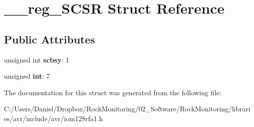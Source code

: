 \hypertarget{struct____reg___s_c_s_r}{}\section{\+\_\+\+\_\+reg\+\_\+\+S\+C\+SR Struct Reference}
\label{struct____reg___s_c_s_r}
\subsection*{Public Attributes}
\begin{DoxyCompactItemize}
\item 
unsigned int {\bfseries scbsy}\+: 1\hypertarget{struct____reg___s_c_s_r_a1780dfd1d47a42196b43c7d993576e01}{}\label{struct____reg___s_c_s_r_a1780dfd1d47a42196b43c7d993576e01}

\item 
unsigned {\bfseries int}\+: 7\hypertarget{struct____reg___s_c_s_r_a812a2b4830d99c4f29ed77011886d87c}{}\label{struct____reg___s_c_s_r_a812a2b4830d99c4f29ed77011886d87c}

\end{DoxyCompactItemize}


The documentation for this struct was generated from the following file\+:\begin{DoxyCompactItemize}
\item 
C\+:/\+Users/\+Daniel/\+Dropbox/\+Rock\+Monitoring/02\+\_\+\+Software/\+Rock\+Monitoring/libraries/avr/include/avr/iom128rfa1.\+h\end{DoxyCompactItemize}
